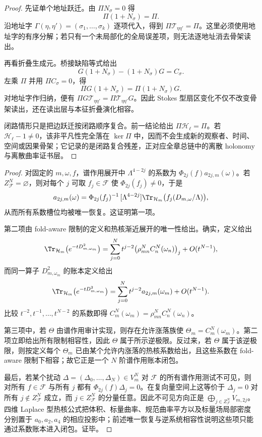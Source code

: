 \begin{proof}
先证单个地址跃迁。由 \(\Pi N_\sigma=0\) 得
\[
\Pi(1+N_\sigma)=\Pi.
\]
沿地址字 \(\Gamma(\eta,\eta')=(\sigma_1,\ldots,\sigma_k)\) 逐项代入，得到
\(\Pi\mathcal T_{\eta\eta'}=\Pi\)。这里必须使用地址字的有序分解；若只有一个未局部化的全局误差项，则无法逐地址消去骨架读出。

再看折叠生成元。桥接缺陷等式给出
\[
G(1+N_\sigma)-(1+N_\sigma)G=C_\sigma.
\]
左乘 \(\Pi\) 并用 \(\Pi C_\sigma=0\)，得
\[
\Pi G(1+N_\sigma)=\Pi(1+N_\sigma)G.
\]
对地址字作归纳，便有
\(\Pi G\mathcal T_{\eta\eta'}=\Pi\mathcal T_{\eta\eta'}G\)。因此 Stokes 型扇区变化不仅不改变骨架读出，还在读出层与本征折叠演化相容。

闭路情形只是把边跃迁按闭路顺序复合。前一结论给出
\(\Pi\mathcal H_\ell=\Pi\)。若 \(\mathcal H_\ell-1\neq0\)，该非平凡性完全落在
\(\ker\Pi\) 中，因而不会生成新的观察者、时间、空间或因果骨架；它记录的是闭路复合残差，正对应全章总链中的离散 holonomy 与离散曲率证书层。
\end{proof}

\begin{proof}
对固定的 \(m,\omega,f\)，谱作用展开中 \(\Lambda^{4-2j}\) 的系数为 \(\Phi_{2j}(f)a_{2j,m}(\omega)\)。若 \(Z_{\mathcal F}^N=\varnothing\)，则对每个 \(j\) 可取 \(f_j\in\mathcal F\) 使 \(\Phi_{2j}(f_j)\ne0\)，于是
\[
a_{2j,m}(\omega)=\Phi_{2j}(f_j)^{-1}\,[\Lambda^{4-2j}]\Tr_{\mathcal H_m}\bigl(f_j(D_{m,\omega}/\Lambda)\bigr),
\]
从而所有系数槽位均被唯一恢复。这证明第一项。

第二项由 fold-aware 限制的定义和热核渐近展开的唯一性给出。确实，定义给出
\[
\Tr_{\mathcal H_m}\bigl(e^{-tD_{m,\omega_m}^2}\bigr)
=\sum_{j=0}^{N}t^{j-2}\bigl(\rho_{mn}^N C_n^N(\omega_n)\bigr)_j+O(t^{N-1}),
\]
而同一算子 \(D_{m,\omega_m}^2\) 的账本定义给出
\[
\Tr_{\mathcal H_m}\bigl(e^{-tD_{m,\omega_m}^2}\bigr)
=\sum_{j=0}^{N}t^{j-2}a_{2j,m}(\omega_m)+O(t^{N-1}).
\]
比较 \(t^{-2},t^{-1},\ldots,t^{N-2}\) 的系数即得
\(C_m^N(\omega_m)=\rho_{mn}^N C_n^N(\omega_n)\)。

第三项中，若 \(\Theta\) 由谱作用审计实现，则存在允许涨落族使 \(\Theta_m=C_m^N(\omega_m)\)。第二项立即给出所有限制相容性，因此 \(\Theta\) 属于所示逆极限。反过来，若 \(\Theta\) 属于该逆极限，则按定义每个 \(\Theta_m\) 已由某个允许内涨落的热核系数给出，且这些系数在 fold-aware 限制下相容；故它正是一个 \(N\) 阶谱作用账本闭包。

最后，若某个扰动 \(\Delta=(\Delta_0,\ldots,\Delta_N)\in V_m^N\) 对 \(\mathcal F\) 的所有谱作用测试不可见，则对所有 \(f\in\mathcal F\) 与所有 \(j\) 都有 \(\Phi_{2j}(f)\Delta_j=0\)。在复向量空间上这等价于 \(\Delta_j=0\) 对所有 \(j\notin Z_{\mathcal F}^N\) 成立，而 \(j\in Z_{\mathcal F}^N\) 的分量任意。因此不可见方向正是 \(\bigoplus_{j\in Z_{\mathcal F}^N}V_{m,2j}\)。四维 Laplace 型热核公式把体积、标量曲率、规范曲率平方以及标量场局部密度分别置于 \(a_0,a_2,a_4\) 的相应投影中；前述唯一恢复与逆系统相容性说明这些项只能通过系数账本进入闭包。证毕。
\end{proof}

